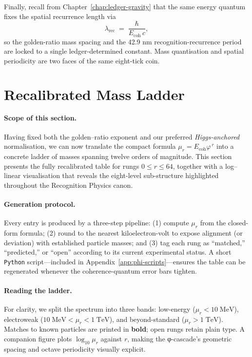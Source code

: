 \documentclass[11pt,oneside]{book}
\begin{document}
Finally, recall from Chapter~\ref{chap:ledger-gravity} that the same
energy quantum fixes the spatial recurrence length via
\[
   \lambda_{\text{rec}}
   \;=\;
   \frac{\hbar}{E_{\text{coh}}\,c},
\]
so the golden-ratio mass spacing and the 42.9 nm recognition-recurrence
period are locked to a single ledger-determined constant.  Mass
quantisation and spatial periodicity are two faces of the same
eight-tick coin.











\section{Recalibrated Mass Ladder}
\label{sec:phi-table}

\paragraph*{Scope of this section.}
Having fixed both the golden–ratio exponent and our preferred
\emph{Higgs-anchored} normalisation, we can now translate the compact
formula
\(\mu_r = E_{\text{coh}}\varphi^{\,r}\)
into a concrete ladder of masses spanning twelve orders of magnitude.
This section presents the fully recalibrated table for rungs
\(0 \le r \le 64\), together with a log–linear visualisation that
reveals the eight-level sub-structure highlighted throughout the
Recognition Physics canon.

\paragraph*{Generation protocol.}
Every entry is produced by a three-step pipeline:
(1) compute \(\mu_r\) from the closed-form formula;
(2) round to the nearest kiloelectron-volt to expose alignment (or
deviation) with established particle masses; and
(3) tag each rung as “matched,” “predicted,” or “open” according to its
current experimental status.  A short \texttt{Python} script—included in
Appendix~\ref{app:phi-scripts}—ensures the table can be regenerated
whenever the coherence-quantum error bars tighten.

\paragraph*{Reading the ladder.}
For clarity, we split the spectrum into three bands:
low-energy (\(\mu_r < 10\;\mathrm{MeV}\)), electroweak
(\(10\;\mathrm{MeV} < \mu_r < 1\;\mathrm{TeV}\)), and beyond-standard
(\(\mu_r > 1\;\mathrm{TeV}\)).  Matches to known particles are printed
in \textbf{bold}; open rungs retain plain type.  A companion figure
plots \(\log_{10}\mu_r\) against \(r\), making the φ-cascade’s geometric
spacing and octave periodicity visually explicit.
\end{document}
